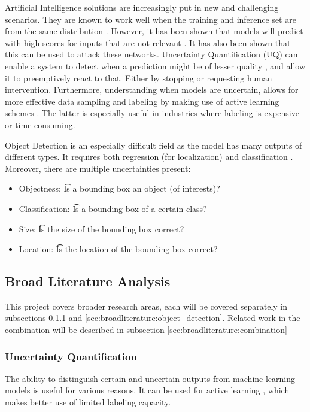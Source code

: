 Artificial Intelligence solutions are increasingly put in new and challenging scenarios. They are known to work well when the training and inference set are from the same distribution \cite{krizhevsky2012imagenet}. However, it has been shown that models will predict with high scores for inputs that are not relevant \cite{Nguyen_2015_CVPR,szegedy2013intriguing}. It has also been shown that this can be used to attack these networks\cite{goodfellow2014explaining,dong2018boosting}.
Uncertainty Quantification (UQ) can enable a system to detect when a prediction might be of lesser quality \cite{däubener2020detecting}, and allow it to preemptively react to that\cite{osti_1481629}. Either by stopping or requesting human intervention.
Furthermore, understanding when models are uncertain, allows for more effective data sampling and labeling by making use of active learning schemes \cite{settles2009active,Bernhardt_2022,yang2009effective}. The latter is especially useful in industries where labeling is expensive or time-consuming.

Object Detection is an especially difficult field as the model has many outputs of different types. It requires both regression (for localization) and classification \cite{Gasperini_2022}. Moreover, there are multiple uncertainties present:
\begin{itemize}
    \item Objectness: \t Is a bounding box an object (of interests)?
    \item Classification: \t Is a bounding box of a certain class?
    \item Size: \t Is the size of the bounding box correct?
    \item Location: \t Is the location of the bounding box correct?
\end{itemize}


\subsection{Broad Literature Analysis}\label{sec:broadliterature}

This project covers broader research areas, each will be covered separately in subsections \ref{sec:broadliterature:uncertainty} and \ref{sec:broadliterature:object_detection}. Related work in the combination will be described in subsection \ref{sec:broadliterature:combination}

\subsubsection{Uncertainty Quantification}\label{sec:broadliterature:uncertainty}
The ability to distinguish certain and uncertain outputs from machine learning models is useful for various reasons. It can be used for active learning \cite{yang2009effective,settles2009active,houlsby2011bayesian,Bernhardt_2022}, which makes better use of limited labeling capacity.

